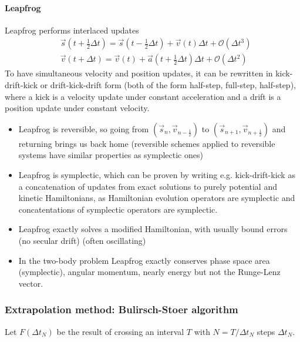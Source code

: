 \paragraph*{Leapfrog} Leapfrog performs interlaced updates
\begin{equation}
    \begin{aligned}
    & \vec{s}(t + \frac{1}{2} \Delta t)=\vec{s}(t - \frac{1}{2} \Delta t)+ \vec{v}(t) \Delta t + \mathcal{O}(\Delta t^3) \\
    & \vec{v}(t + \Delta t)=\vec{v}(t)+ \vec{a}(t + \frac{1}{2} \Delta t) \Delta t  + \mathcal{O}(\Delta t^2)
    \end{aligned}
\end{equation}
To have simultaneous velocity and position updates, it can
be rewritten in kick-drift-kick or drift-kick-drift form (both of the form
half-step, full-step, half-step), where a kick is a velocity update
under constant acceleration and a drift is a position update under constant velocity.
\begin{itemize}
    \item \textcolor{green1}{Leapfrog is reversible}, so going from $\left( \vec{s}_n, \vec{v}_{n-\frac{1}{2}} \right)$ to $\left( \vec{s}_{n+1}, \vec{v}_{n+\frac{1}{2}} \right)$ and returning brings us back home (reversible
    schemes applied to reversible systems have similar properties as symplectic ones)
    \item \textcolor{green1}{Leapfrog is symplectic}, which can be proven by writing e.g. kick-drift-kick as a concatenation of updates from exact solutions to purely potential and kinetic Hamiltonians,
    as Hamiltonian evolution operators are symplectic and concatentations of symplectic operators are symplectic.
    \item \textcolor{green1}{Leapfrog exactly solves a modified Hamiltonian}, with usually bound errors (no secular drift) (often oscillating)
    \item In the two-body problem Leapfrog exactly conserves phase space area (symplectic), angular momentum, nearly energy but not the Runge-Lenz vector.
\end{itemize}

\subsubsection*{Extrapolation method: Bulirsch-Stoer algorithm}
Let $F(\Delta t_N)$ be the result of crossing an interval
$T$ with $N = T \slash \Delta t_N$ steps $\Delta t_N$.
